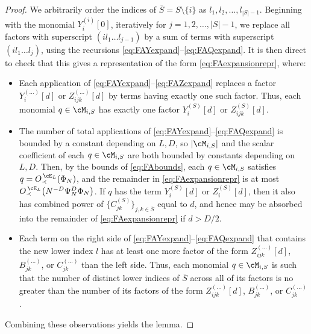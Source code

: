 \begin{proof}
We arbitrarily order the indices of $\bar S=S \setminus \{i\}$ as
$l_1,l_2,\ldots,l_{|S|-1}$. Beginning with the monomial $Y_i^{(i)}[0]$,
iteratively for $j=1,2,\ldots,|S|-1$, we
replace all factors with superscript $(il_1\ldots l_{j-1})$
by a sum of terms with superscript $(il_1\ldots l_j)$,
using the recursions \eqref{eq:FAYexpand}--\eqref{eq:FAQexpand}. It is then
direct to check that
this gives a representation of the form \eqref{eq:FAexpansionrepr}, where:
\begin{itemize}
\item Each application of \eqref{eq:FAYexpand}--\eqref{eq:FAZexpand} replaces a
factor $Y_i^{(\ldots)}[d]$ or $Z_{ijk}^{(\ldots)}[d]$ by terms
having exactly one such factor. Thus, each monomial $q \in \cM_{i,S}$
has exactly one factor $Y_i^{(S)}[d]$ or $Z_{ijk}^{(S)}[d]$.
\item The number of total applications of
\eqref{eq:FAYexpand}--\eqref{eq:FAQexpand} is bounded by a constant depending on
$L,D$, so $|\cM_{i,S}|$ and the scalar coefficient of each $q \in \cM_{i,S}$
are both bounded by constants depending on $L,D$. Then, by the bounds of
\eqref{eq:FAbounds}, each $q \in \cM_{i,S}$ satisfies
$q=\SDcEL{\Phi_N}$, and the remainder in \eqref{eq:FAexpansionrepr} is at most
$\SDcEL{N^{-D}\Psi_N^D\Phi_N}$. If $q$ has the term $Y_i^{(S)}[d]$ or
$Z_i^{(S)}[d]$, then it also has combined power of
$\{C_{jk}^{(S)}\}_{j,k \in \bar S}$ equal to $d$, and hence may be
absorbed into the remainder of \eqref{eq:FAexpansionrepr} if $d>D/2$.
\item Each term on the right side of \eqref{eq:FAYexpand}--\eqref{eq:FAQexpand}
that contains the new lower index $l$ has at least one more factor of the
form $Z_{ijk}^{(\ldots)}[d]$, $B_{jk}^{(\ldots)}$, or $C_{jk}^{(\ldots)}$ than the left side. Thus, each monomial $q \in \cM_{i,S}$ is such
that the number of distinct lower indices of $\bar S$ across all of its factors
is no greater than the number of its factors of the form
$Z_{ijk}^{(\ldots)}[d]$, $B_{jk}^{(\ldots)}$, or $C_{jk}^{(\ldots)}$.
\end{itemize}
Combining these observations yields the lemma.
\end{proof}

